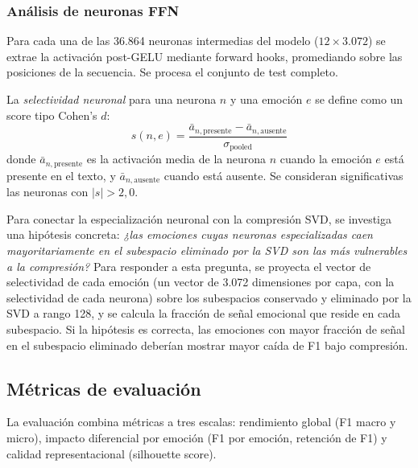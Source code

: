 \subsubsection{Análisis de neuronas FFN}
\label{sec:met-neuronas}

Para cada una de las 36.864 neuronas intermedias del modelo ($12 \times 3.072$) se
extrae la activación post-GELU mediante forward hooks, promediando sobre las posiciones
de la secuencia. Se procesa el conjunto de test completo.

La \emph{selectividad neuronal} para una neurona $n$ y una emoción $e$ se define
como un score tipo Cohen's $d$:
\begin{equation}
    s(n, e) = \frac{\bar{a}_{n,\text{presente}} - \bar{a}_{n,\text{ausente}}}{\sigma_{\text{pooled}}}
    \label{eq:selectividad}
\end{equation}
donde $\bar{a}_{n,\text{presente}}$ es la activación media de la neurona $n$ cuando
la emoción $e$ está presente en el texto, y $\bar{a}_{n,\text{ausente}}$ cuando está
ausente. Se consideran significativas las neuronas con $|s| > 2{,}0$.

Para conectar la especialización neuronal con la compresión SVD, se investiga
una hipótesis concreta: \textit{¿las emociones cuyas neuronas especializadas
caen mayoritariamente en el subespacio eliminado por la SVD son las más
vulnerables a la compresión?} Para responder a esta pregunta, se proyecta el
vector de selectividad de cada emoción (un vector de 3.072 dimensiones por capa,
con la selectividad de cada neurona) sobre los subespacios conservado y eliminado
por la SVD a rango 128, y se calcula la fracción de señal emocional que reside
en cada subespacio. Si la hipótesis es correcta, las emociones con mayor fracción
de señal en el subespacio eliminado deberían mostrar mayor caída de F1 bajo
compresión.

\subsection{Métricas de evaluación}
\label{sec:met-metricas}

La evaluación combina métricas a tres escalas: rendimiento global (F1 macro y
micro), impacto diferencial por emoción (F1 por emoción, retención de F1) y
calidad representacional (silhouette score).

